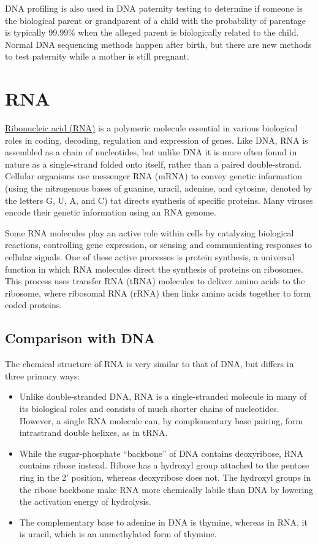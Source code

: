 DNA profiling is also used in DNA paternity testing to determine if someone is the biological parent or grandparent of a child with the probability of parentage is typically 99.99\% when the alleged parent is biologically related to the child. Normal DNA sequencing methods happen after birth, but there are new methods to test paternity while a mother is still pregnant.

\hypertarget{rna}{%
\section{RNA}\label{rna}}

\href{https://en.wikipedia.org/wiki/RNA}{Ribonucleic acid (RNA)} is a polymeric molecule essential in various biological roles in coding, decoding, regulation and expression of genes. Like DNA, RNA is assembled as a chain of nucleotides, but unlike DNA it is more often found in nature as a single-strand folded onto itself, rather than a paired double-strand. Cellular organisms use messenger RNA (mRNA) to convey genetic information (using the nitrogenous bases of guanine, uracil, adenine, and cytosine, denoted by the letters G, U, A, and C) tat directs synthesis of specific proteins. Many viruses encode their genetic information using an RNA genome.

Some RNA molecules play an active role within cells by catalyzing biological reactions, controlling gene expression, or sensing and communicating responses to cellular signals. One of these active processes is protein synthesis, a universal function in which RNA molecules direct the synthesis of proteins on ribosomes. This process uses transfer RNA (tRNA) molecules to deliver amino acids to the ribosome, where ribosomal RNA (rRNA) then links amino acids together to form coded proteins.

\hypertarget{comparison-with-dna}{%
\subsection{Comparison with DNA}\label{comparison-with-dna}}

The chemical structure of RNA is very similar to that of DNA, but differs in three primary ways:

\begin{itemize}
\tightlist
\item
  Unlike double-stranded DNA, RNA is a single-stranded molecule in many of its biological roles and consists of much shorter chains of nucleotides. However, a single RNA molecule can, by complementary base pairing, form intrastrand double helixes, as in tRNA.
\item
  While the sugar-phosphate ``backbone'' of DNA contains deoxyribose, RNA contains ribose instead. Ribose has a hydroxyl group attached to the pentose ring in the 2' position, whereas deoxyribose does not. The hydroxyl groups in the ribose backbone make RNA more chemically labile than DNA by lowering the activation energy of hydrolysis.
\item
  The complementary base to adenine in DNA is thymine, whereas in RNA, it is uracil, which is an unmethylated form of thymine.
\end{itemize}


